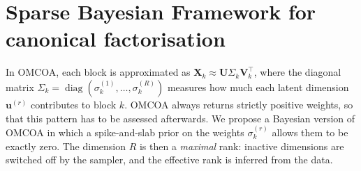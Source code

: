 \documentclass[11pt]{article}
\newtheorem{remark}{Remark}
\DeclareMathOperator{\diag}{diag}
\newcommand{\X}{\mathbf{X}}
\newcommand{\U}{\mathbf{U}}
\newcommand{\V}{\mathbf{V}}
\newcommand{\uu}{\mathbf{u}}
\begin{document}


\section{Sparse Bayesian Framework for canonical factorisation}
In OMCOA, each block is approximated as $\X_k\approx\U\Sigma_k\V_k^\intercal$, where the diagonal matrix
$\Sigma_k=\diag(\sigma_k^{(1)},\ldots,\sigma_k^{(R)})$ measures how much each latent dimension $\uu^{(r)}$ contributes to block $k$. 
OMCOA always returns strictly positive weights, so that this pattern has to be assessed afterwards. We propose a Bayesian version of OMCOA in which a spike-and-slab prior on the weights $\sigma_k^{(r)}$ allows them to be exactly zero. The dimension $R$ is then a \emph{maximal} rank: inactive dimensions are switched off by the sampler, and the effective rank is inferred from the data.
\end{document}
